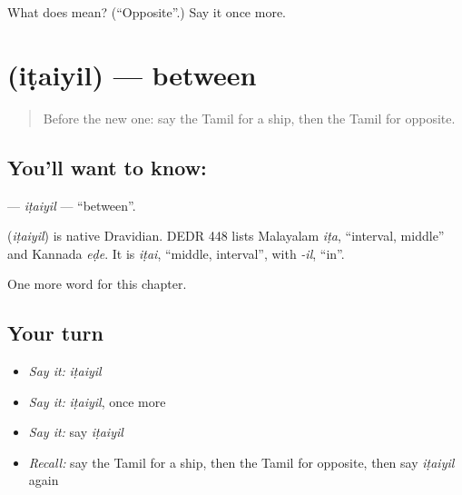 \begin{tcolorbox}[breakable,colback=teal!4,colframe=teal!35!black,title={Before you move on}]
What does  mean? (\textquotedblleft{}Opposite\textquotedblright{}.) Say it once more.
\end{tcolorbox}
\section[\texorpdfstring{\ta{இடையில்} (iṭaiyil)}{இடையில் (iṭaiyil)}]{ (iṭaiyil) — between}

\label{lesson:TA-C264-itaiyil}



\begin{quote}
Before the new one: say the Tamil for a ship, then the Tamil for opposite.
\end{quote}

\subsection*{You'll want to know: }
\textbf{} — \emph{iṭaiyil} — \textquotedblleft{}between\textquotedblright{}.

\begin{cousinweb}
\textbf{} (\emph{iṭaiyil}) is native Dravidian. DEDR 448 lists Malayalam \emph{iṭa}, \textquotedblleft{}interval, middle\textquotedblright{} and Kannada \emph{eḍe}. It is \emph{iṭai}, \textquotedblleft{}middle, interval\textquotedblright{}, with \emph{-il}, \textquotedblleft{}in\textquotedblright{}.
\end{cousinweb}

\begin{grammarlens}[title={What you've built}]
One more word for this chapter.
\end{grammarlens}

\subsection*{Your turn}
\begin{itemize}
\raggedright
  \item \emph{Say it:} \emph{iṭaiyil}
  \item \emph{Say it:} \emph{iṭaiyil}, once more
  \item \emph{Say it:} say \emph{iṭaiyil}
  \item \emph{Recall:} say the Tamil for a ship, then the Tamil for opposite, then say \emph{iṭaiyil} again
\end{itemize}


